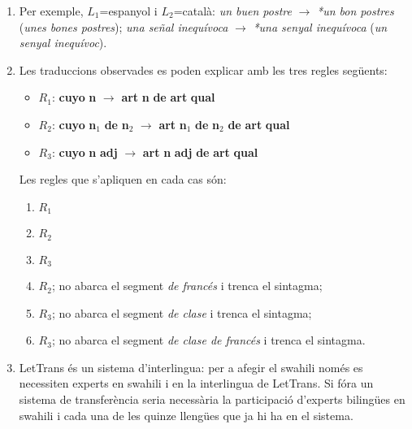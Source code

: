 \begin{enumerate}
\item Per exemple, $L_1$=espanyol i $L_2$=català: \emph{un buen
    postre} $\rightarrow$ \emph{*un bon postres} (\emph{unes bones
    postres}); \emph{una señal inequívoca} $\rightarrow$ \emph{*una
    senyal inequívoca} (\emph{un senyal inequívoc}).

\item Les traduccions observades es poden explicar amb les tres regles
  següents:
  \begin{itemize}
  \item $R_1$: {\bf cuyo} {\bf n} $\rightarrow$ {\bf art} {\bf n} {\bf
      de} {\bf art} {\bf qual}
  \item $R_2$: {\bf cuyo} {\bf n}$_1$ {\bf de} {\bf n}$_2$
    $\rightarrow$ {\bf art} {\bf n}$_1$ {\bf de} {\bf n}$_2$ {\bf de}
    {\bf art} {\bf qual}
  \item $R_3$: {\bf cuyo} {\bf n} {\bf adj} $\rightarrow$ {\bf art}
    {\bf n} {\bf adj} {\bf de} {\bf art} {\bf qual}
  \end{itemize}
  Les regles que s'apliquen en cada cas són:
  \begin{enumerate}
  \item $R_1$
  \item $R_2$
  \item $R_3$
  \item $R_2$; no abarca el segment \emph{de francés} i trenca el
    sintagma;
  \item $R_3$; no abarca el segment \emph{de clase} i trenca el
    sintagma;
  \item $R_3$; no abarca el segment \emph{de clase de francés} i
    trenca el sintagma.
  \end{enumerate}

\item LetTrans és un sistema d'interlingua: per a afegir el swahili
  només es necessiten experts en swahili i en la interlingua de
  LetTrans. Si fóra un sistema de transferència seria necessària la
  participació d'experts bilingües en swahili i cada una de les quinze
  llengües que ja hi ha en el sistema.


\end{enumerate}
